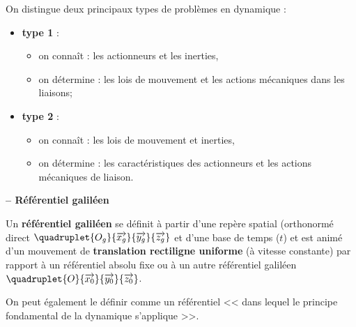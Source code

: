 On distingue deux principaux types de problèmes en dynamique : 
\begin{itemize}
\item \textbf{type 1} :
\begin{itemize}
\item on connaît : les actionneurs et les inerties,
\item on détermine : les lois de mouvement et les actions mécaniques dans les liaisons;
\end{itemize} 
\item \textbf{type 2} :
\begin{itemize}
\item on connaît : les lois de mouvement et inerties,
\item on détermine : les caractéristiques des actionneurs et les actions mécaniques de liaison.
\end{itemize}
\end{itemize}




\begin{definition}\textbf{\textsf{\small -- Référentiel galiléen}}

Un \textbf{référentiel galiléen} se définit à partir d'une repère spatial (orthonormé direct $\quadruplet{O_g}{\overrightarrow{x_g}}{\overrightarrow{y_g}}{\overrightarrow{z_g}}$ et d'une base de temps ($t$) et est animé d'un mouvement de \textbf{translation rectiligne uniforme} (à vitesse constante) par rapport à un référentiel absolu fixe ou à un autre référentiel galiléen $\quadruplet{O}{\overrightarrow{x_0}}{\overrightarrow{y_0}}{\overrightarrow{z_0}}$. 

On peut également le définir comme un référentiel << dans lequel le principe fondamental de la dynamique s'applique >>.
\end{definition}

